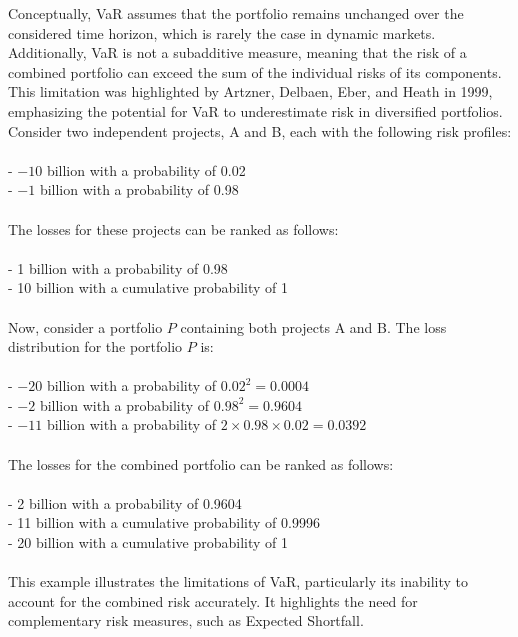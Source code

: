 \documentclass[a4paper,10pt]{article}
\begin{document}
\noindent Conceptually, VaR assumes that the portfolio remains unchanged over the considered time horizon, which is rarely the case in dynamic markets. Additionally, VaR is not a subadditive measure, meaning that the risk of a combined portfolio can exceed the sum of the individual risks of its components. This limitation was highlighted by Artzner, Delbaen, Eber, and Heath in 1999, emphasizing the potential for VaR to underestimate risk in diversified portfolios.\\

\noindent Consider two independent projects, A and B, each with the following risk profiles:\\\\
- \(-10\) billion with a probability of 0.02\\
- \(-1\) billion with a probability of 0.98\\\\
The losses for these projects can be ranked as follows:\\\\
- 1 billion with a probability of 0.98\\
- 10 billion with a cumulative probability of 1\\\\
Now, consider a portfolio \(P\) containing both projects A and B. The loss distribution for the portfolio \(P\) is:\\\\
- \(-20\) billion with a probability of \(0.02^2 = 0.0004\)\\
- \(-2\) billion with a probability of \(0.98^2 = 0.9604\)\\
- \(-11\) billion with a probability of \(2 \times 0.98 \times 0.02 = 0.0392\)\\\\
The losses for the combined portfolio can be ranked as follows:\\\\
- 2 billion with a probability of 0.9604\\
- 11 billion with a cumulative probability of 0.9996\\
- 20 billion with a cumulative probability of 1\\\\
This example illustrates the limitations of VaR, particularly its inability to account for the combined risk accurately. It highlights the need for complementary risk measures, such as Expected Shortfall.\\
\end{document}
